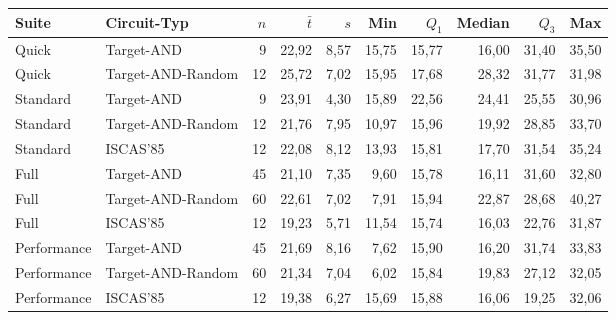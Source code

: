 \begin{tabular}{llrrrrrrrr}
\toprule
Suite & Circuit-Typ & $n$ & $\bar{t}$ & $s$ & Min & $Q_1$ & Median & $Q_3$ & Max \\
\midrule
Quick & Target-AND & 9 & 22,92 & 8,57 & 15,75 & 15,77 & 16,00 & 31,40 & 35,50 \\
Quick & Target-AND-Random & 12 & 25,72 & 7,02 & 15,95 & 17,68 & 28,32 & 31,77 & 31,98 \\
Standard & Target-AND & 9 & 23,91 & 4,30 & 15,89 & 22,56 & 24,41 & 25,55 & 30,96 \\
Standard & Target-AND-Random & 12 & 21,76 & 7,95 & 10,97 & 15,96 & 19,92 & 28,85 & 33,70 \\
Standard & ISCAS'85 & 12 & 22,08 & 8,12 & 13,93 & 15,81 & 17,70 & 31,54 & 35,24 \\
Full & Target-AND & 45 & 21,10 & 7,35 & 9,60 & 15,78 & 16,11 & 31,60 & 32,80 \\
Full & Target-AND-Random & 60 & 22,61 & 7,02 & 7,91 & 15,94 & 22,87 & 28,68 & 40,27 \\
Full & ISCAS'85 & 12 & 19,23 & 5,71 & 11,54 & 15,74 & 16,03 & 22,76 & 31,87 \\
Performance & Target-AND & 45 & 21,69 & 8,16 & 7,62 & 15,90 & 16,20 & 31,74 & 33,83 \\
Performance & Target-AND-Random & 60 & 21,34 & 7,04 & 6,02 & 15,84 & 19,83 & 27,12 & 32,05 \\
Performance & ISCAS'85 & 12 & 19,38 & 6,27 & 15,69 & 15,88 & 16,06 & 19,25 & 32,06 \\
\bottomrule
\end{tabular}
